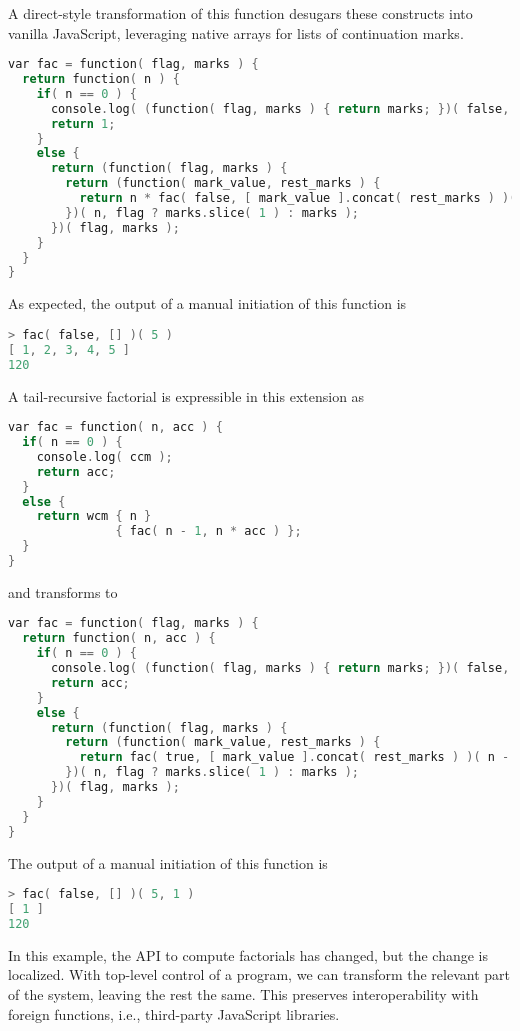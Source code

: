 \documentclass{llncs}
\begin{document}
A direct-style transformation of this function desugars these constructs into vanilla JavaScript, leveraging native arrays for lists of continuation marks.
\begin{lstlisting}[language=C,morekeywords={var,function,wcm,ccm,true,false}]
var fac = function( flag, marks ) {
  return function( n ) {
    if( n == 0 ) {
      console.log( (function( flag, marks ) { return marks; })( false, marks ) );
      return 1;
    }
    else {
      return (function( flag, marks ) {
        return (function( mark_value, rest_marks ) {
          return n * fac( false, [ mark_value ].concat( rest_marks ) )( n - 1 );
        })( n, flag ? marks.slice( 1 ) : marks );
      })( flag, marks );
    }
  }
}
\end{lstlisting}

As expected, the output of a manual initiation of this function is
\begin{lstlisting}[language=C,morekeywords={var,function,wcm,ccm,true,false}]
> fac( false, [] )( 5 )
[ 1, 2, 3, 4, 5 ]
120
\end{lstlisting}

A tail-recursive factorial is expressible in this extension as
\begin{lstlisting}[language=C,morekeywords={var,function,wcm,ccm,true,false}]
var fac = function( n, acc ) {
  if( n == 0 ) {
    console.log( ccm );
    return acc;
  }
  else {
    return wcm { n }
               { fac( n - 1, n * acc ) };
  }
}
\end{lstlisting}
and transforms to
\begin{lstlisting}[language=C,morekeywords={var,function,wcm,ccm,true,false}]
var fac = function( flag, marks ) {
  return function( n, acc ) {
    if( n == 0 ) {
      console.log( (function( flag, marks ) { return marks; })( false, marks ) );
      return acc;
    }
    else {
      return (function( flag, marks ) {
        return (function( mark_value, rest_marks ) {
          return fac( true, [ mark_value ].concat( rest_marks ) )( n - 1, n * acc );
        })( n, flag ? marks.slice( 1 ) : marks );
      })( flag, marks );
    }
  }
}
\end{lstlisting}

The output of a manual initiation of this function is
\begin{lstlisting}[language=C,morekeywords={var,function,wcm,ccm,true,false}]
> fac( false, [] )( 5, 1 )
[ 1 ]
120
\end{lstlisting}

In this example, the API to compute factorials has changed, but the change is localized. With top-level control of a program, we can transform the relevant part of the system, leaving the rest the same. This preserves interoperability with foreign functions, i.e., third-party JavaScript libraries.
 
\end{document}
